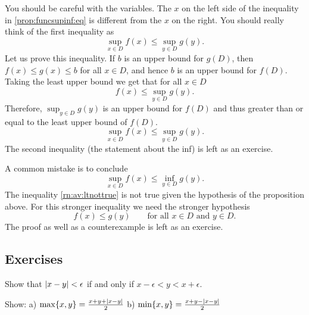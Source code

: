 You should be careful with the variables.  The $x$ on the left side of
the inequality in \eqref{prop:funcsupinf:eq}
is different from the $x$ on the right.  You
should really think of the first inequality as
\begin{equation*}
\sup_{x \in D} f(x) \leq \sup_{y \in D} g(y) .
\end{equation*}
Let us prove this inequality.  If $b$ is an upper bound for $g(D)$, then
$f(x) \leq g(x) \leq b$ for all $x \in D$, and hence $b$ is an upper bound for $f(D)$.
Taking the least upper bound we get that for all $x \in D$
\begin{equation*}
f(x) \leq \sup_{y \in D} g(y) .
\end{equation*}
Therefore,
$\sup_{y \in D} g(y)$ is an upper bound for $f(D)$ and thus greater than or
equal to the least upper bound of $f(D)$.
\begin{equation*}
\sup_{x \in D} f(x) \leq \sup_{y \in D} g(y) .
\end{equation*}
The second inequality (the statement about the inf) is left as an exercise.

\medskip

A common mistake is to conclude 
\begin{equation} \label{rn:av:ltnottrue}
\sup_{x \in D} f(x) \leq \inf_{y \in D} g(y) .
\end{equation}
The inequality \eqref{rn:av:ltnottrue} is not true given the hypothesis of
the proposition above.  For this stronger
inequality we need the stronger hypothesis
\begin{equation*}
f(x) \leq g(y) \qquad \text{for all } x \in D \text{ and } y \in D.
\end{equation*}
The proof as well as a counterexample is left as an exercise.

\subsection{Exercises}

\begin{exercise}
Show that
$\left\lvert {x-y} \right\rvert < \epsilon$ if and only if $x-\epsilon < y < x+\epsilon$.
\end{exercise}

\begin{exercise}
Show: \qquad
a)
$\max \{x,y\} = \frac{x+y+\left\lvert {x-y} \right\rvert}{2}$
\qquad
b)
$\min \{x,y\} = \frac{x+y-\left\lvert {x-y} \right\rvert}{2}$
\end{exercise}

